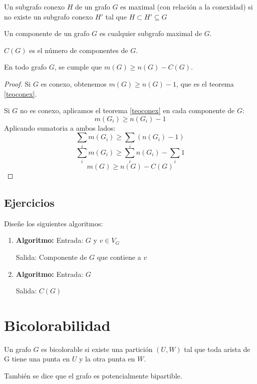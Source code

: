 \begin{definicion}
Un subgrafo conexo $H$ de un grafo $G$ es maximal (con relación a la conexidad) si no existe un subgrafo conexo $H'$ tal que $H \subset H'\subseteq G$
\end{definicion}

\begin{definicion}
Un componente de un grafo $G$ es cualquier subgrafo maximal de $G$.
\end{definicion}

\notacion $C(G)$ es el número de componentes de $G$.

\begin{teorema}
En todo grafo $G$, se cumple que $m(G)\ge n(G)-C(G)$.
\end{teorema}

\begin{proof}
Si $G$ es conexo, obtenemos $m(G)\ge n(G)-1$, que es el teorema \ref{teoconex}.

Si $G$ no es conexo, aplicamos el teorema \ref{teoconex} en cada componente de $G$:
$$m(G_i)\ge n(G_i)-1$$
Aplicando sumatoria a ambos lados:
$$\sum_i m(G_i)\ge\sum_i (n(G_i)-1)$$
$$\sum_i m(G_i)\ge\sum_i n(G_i)-\sum_i1$$
$$m(G)\ge n(G)-C(G)$$
\end{proof}

\subsection*{Ejercicios}
Diseñe los siguientes algoritmos:
\begin{enumerate}
\item {\bf Algoritmo:} Entrada: $G$ y $v\in V_G$

Salida: Componente de $G$ que contiene a $v$
\item {\bf Algoritmo:} Entrada: $G$

Salida: $C(G)$
\end{enumerate}



\section{Bicolorabilidad}

\begin{definicion}
Un grafo $G$ es bicolorable si existe una partición $(U,W)$ tal que toda arista de G tiene una punta en $U$ y la otra punta en $W$.
\end{definicion}
También se dice que el grafo es potencialmente bipartible.

